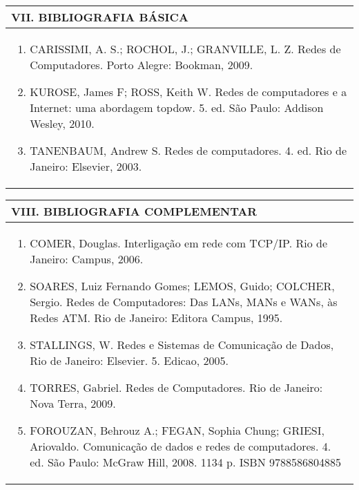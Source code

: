 \documentclass[12pt]{article}
\begin{document}
\begin{longtable}{|L{1.025\textwidth}|} \hline
%
{\bf VII. BIBLIOGRAFIA BÁSICA} \\ \hline
\begin{enumerate}
%
\item CARISSIMI, A. S.; ROCHOL, J.; GRANVILLE, L. Z. Redes de Computadores. Porto Alegre: Bookman, 2009.
\item KUROSE, James F; ROSS, Keith W. Redes de computadores e a Internet: uma abordagem topdow.
5. ed. São Paulo: Addison Wesley, 2010.
\item TANENBAUM, Andrew S. Redes de computadores. 4. ed. Rio de Janeiro: Elsevier, 2003.

%

\end{enumerate}
 \\ \hline
\end{longtable}



\begin{longtable}{|L{1.025\textwidth}|} \hline
%
{\bf VIII. BIBLIOGRAFIA COMPLEMENTAR} \\ \hline
\begin{enumerate}
\item COMER, Douglas. Interligação em rede com TCP/IP. Rio de Janeiro: Campus, 2006.
\item SOARES, Luiz Fernando Gomes; LEMOS, Guido; COLCHER, Sergio. Redes de Computadores: Das LANs, MANs e WANs, às Redes ATM. Rio de Janeiro: Editora Campus, 1995.
\item STALLINGS, W. Redes e Sistemas de Comunicação de Dados, Rio de Janeiro: Elsevier. 5. Edicao, 2005.
\item TORRES, Gabriel. Redes de Computadores. Rio de Janeiro: Nova Terra, 2009. 
\item FOROUZAN, Behrouz A.; FEGAN, Sophia Chung; GRIESI, Ariovaldo. Comunicação de dados e redes de computadores. 4. ed. São Paulo: McGraw Hill, 2008. 1134 p. ISBN 9788586804885
%
\end{enumerate}
 \\ \hline
\end{longtable}



\end{document}
